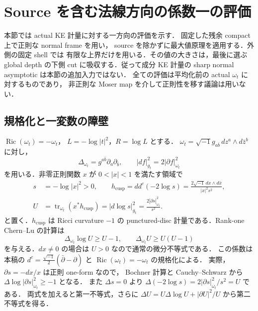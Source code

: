 \section{Source を含む法線方向の係数一の評価}
\label{ke:sharp-normal-section}

本節では actual KE 計量に対する一方向の評価を示す．
固定した残余 compact 上で正則な normal frame を用い，
source を除かずに最大値原理を適用する．外側の固定 shell では
有限な上界だけを用いる．その値の大きさは，最後に選ぶ
global depth の下側 cut に吸収する．従って成分 KE 計量の
sharp normal asymptotic は本節の追加入力ではない．
全ての評価は平均化前の actual $\omega_t$ に対するものであり，
非正則な Moser map を介して正則性を移す議論は用いない．

\subsection{規格化と一変数の障壁}

$\operatorname{Ric}(\omega_t)=-\omega_t$，
$L=-\log|t|^2$，$R=\log L$ とする．
$\omega_t=\sqrt{-1}g_{a\bar b}\,dz^a\wedge d\bar z^b$ に対し，
\[
 \Delta_{\omega_t}=g^{a\bar b}\partial_a\partial_{\bar b},
 \qquad |df|_{g_t}^2=2|\partial f|_{\omega_t}^2
\]
を用いる．非零正則関数 $x$ が $0<|x|<1$ を満たす領域で
\[
\begin{aligned}
 s&=-\log|x|^2>0,\qquad
 h_{\mathrm{cusp}}=dd^c(-2\log s)
 =\frac{2\sqrt{-1}\,dx\wedge d\bar x}{|x|^2s^2},\\
 U&=\operatorname{tr}_{\omega_t}(x^*h_{\mathrm{cusp}})
       =|d\log s|_{g_t}^2
       =\frac{2|\partial s|_{\omega_t}^2}{s^2}.
\end{aligned}
\]
と置く．$h_{\mathrm{cusp}}$ は Ricci curvature $-1$ の
punctured-disc 計量である．Rank-one Chern--Lu の計算\cite[Theorem~2およびその証明]{YauSchwarz}は
\begin{equation}\label{ke:eq:sharp-normal-logistic}
 \Delta_{\omega_t}\log U\ge U-1,
 \qquad \Delta_{\omega_t}U\ge U(U-1)
\end{equation}
を与える．$dx\ne0$ の場合は $U>0$ なので通常の微分不等式である．
この係数は本稿の $d^c=\frac{\sqrt{-1}}2(\bar\partial-\partial)$ と
$\operatorname{Ric}(\omega_t)=-\omega_t$ の規格化による．
実際，$\partial s=-dx/x$ は正則 one-form なので，
Bochner 計算と Cauchy--Schwarz から
$\Delta\log|\partial s|_{\omega_t}^2\ge-1$ となる．
また $\Delta s=0$ より
$\Delta(-2\log s)=2|\partial s|_{\omega_t}^2/s^2=U$ である．
両式を加えると第一不等式，さらに
$\Delta U=U\Delta\log U+|\partial U|^2/U$ から第二不等式を得る．

